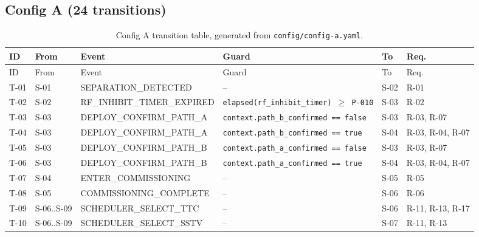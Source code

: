 \subsection{Config A (24 transitions)}\label{app:trans-a}
{\scriptsize
\begin{longtable}{@{}p{}p{}p{}p{}p{}p{}@{}}
\caption{Config A transition table, generated from \texttt{config/config-a.yaml}.}\\
\toprule
ID & From & Event & Guard & To & Req. \\
\midrule
\endfirsthead
\toprule
ID & From & Event & Guard & To & Req. \\
\midrule
\endhead
T-01 & S-01 & SEPARATION\_\allowbreak DETECTED & -- & S-02 & \mbox{R-01} \\
T-02 & S-02 & RF\_\allowbreak INHIBIT\_\allowbreak TIMER\_\allowbreak EXPIRED & \texttt{elapsed(rf\_\allowbreak inhibit\_\allowbreak timer) $\geq$ P-010} & S-03 & \mbox{R-02} \\
T-03 & S-03 & DEPLOY\_\allowbreak CONFIRM\_\allowbreak PATH\_\allowbreak A & \texttt{context.path\_\allowbreak b\_\allowbreak confirmed == false} & S-03 & \mbox{R-03}, \mbox{R-07} \\
T-04 & S-03 & DEPLOY\_\allowbreak CONFIRM\_\allowbreak PATH\_\allowbreak A & \texttt{context.path\_\allowbreak b\_\allowbreak confirmed == true} & S-04 & \mbox{R-03}, \mbox{R-04}, \mbox{R-07} \\
T-05 & S-03 & DEPLOY\_\allowbreak CONFIRM\_\allowbreak PATH\_\allowbreak B & \texttt{context.path\_\allowbreak a\_\allowbreak confirmed == false} & S-03 & \mbox{R-03}, \mbox{R-07} \\
T-06 & S-03 & DEPLOY\_\allowbreak CONFIRM\_\allowbreak PATH\_\allowbreak B & \texttt{context.path\_\allowbreak a\_\allowbreak confirmed == true} & S-04 & \mbox{R-03}, \mbox{R-04}, \mbox{R-07} \\
T-07 & S-04 & ENTER\_\allowbreak COMMISSIONING & -- & S-05 & \mbox{R-05} \\
T-08 & S-05 & COMMISSIONING\_\allowbreak COMPLETE & -- & S-06 & \mbox{R-06} \\
T-09 & S-06..S-09 & SCHEDULER\_\allowbreak SELECT\_\allowbreak TTC & -- & S-06 & \mbox{R-11}, \mbox{R-13}, \mbox{R-17} \\
T-10 & S-06..S-09 & SCHEDULER\_\allowbreak SELECT\_\allowbreak SSTV & -- & S-07 & \mbox{R-11}, \mbox{R-13} \\

\end{longtable}}
